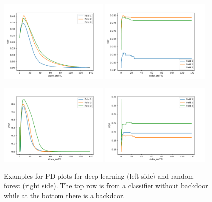 \documentclass[10pt,sigconf,letterpaper,dvipsnames]{acmart}
\begin{document}
\begin{figure}[p]

\includegraphics[width=0.48\textwidth]{../pdp_CAIA_backdoor_17/apply(stdev(ipTTL),forward)_nn.pdf}
\includegraphics[width=0.48\textwidth]{../pdp_CAIA_backdoor_17/apply(stdev(ipTTL),forward)_rf.pdf}

\includegraphics[width=0.48\textwidth]{../pdp_CAIA_backdoor_17/apply(stdev(ipTTL),forward)_nn_bd.pdf}
\includegraphics[width=0.48\textwidth]{../pdp_CAIA_backdoor_17/apply(stdev(ipTTL),forward)_rf_bd.pdf}


\caption{Examples for PD plots for deep learning (left side) and random forest (right side). The top row is from a classifier without backdoor while at the bottom there is a backdoor.}
\label{fig:pdp_backdoor}
\end{figure}
\end{document}
